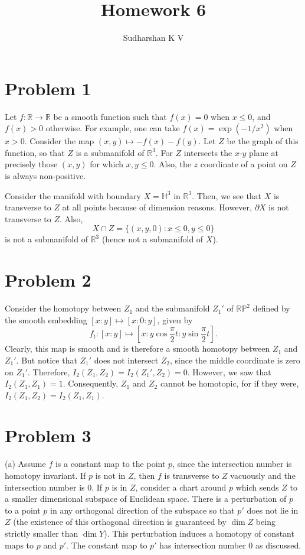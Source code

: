 \documentclass{amsart}
\title{Homework 6}
\author{Sudharshan K V}
\numberwithin{equation}{section}
\theoremstyle{plain}
\theoremstyle{definition}
\theoremstyle{remark}
\renewcommand{\_}[2]{\underbrace{#1}_{#2}}
\renewcommand{\^}[2]{\overbrace{#1}_{#2}}
\newcommand{\R}{\mathbb{R}}
\renewcommand{\P}{\mathbb{P}}
\renewcommand{\H}{\mathbb{H}}
\begin{document}
\maketitle

\section*{Problem 1}
Let $f: \R \to \R$ be a smooth function such that $f(x) = 0$ when $x \leq 0$, and $f(x) > 0$ otherwise. For example, one can take $f(x) =  \exp (-1/x^2)$ when $x> 0$. Consider the map $(x,y)\mapsto -f(x)-f(y)$. Let $Z$ be the graph of this function, so that $Z$ is a submanifold of $\R^3$. For $Z$ intersects the $x$-$y$ plane at precisely those $(x,y)$ for which $x,y\leq 0$. Also, the $z$ coordinate of a point on $Z$ is always non-positive.

Consider the manifold with boundary $X = \H^3$ in $\R^3$. Then, we see that $X$ is transverse to $Z$ at all points because of dimension reasons. However, $\partial X$ is not transverse to $Z$. Also, \[X \cap Z = \{(x,y,0) : x\leq 0, y\leq 0\}\] is not a submanifold of $\R^3$ (hence not a submanifold of $X$). 
\section*{Problem 2}
Consider the homotopy between $Z_1$ and the submanifold $Z_1'$ of $\R\P^2$ defined by the smooth embedding $[x:y]\mapsto [x:0:y]$, given by \[f_t: [x:y] \mapsto [x:y\cos \frac\pi 2 t: y\sin \frac \pi 2 t].\] Clearly, this map is smooth and is therefore a smooth homotopy between $Z_1$ and $Z_1'$. But notice that $Z_1'$ does not intersect $Z_2$, since the middle coordinate is zero on $Z_1'$. Therefore, $I_2(Z_1, Z_2) = I_2(Z_1', Z_2) = 0$. However, we saw that $I_2(Z_1, Z_1) = 1$. Consequently, $Z_1$ and $Z_2$ cannot be homotopic, for if they were, $I_2(Z_1, Z_2) = I_2(Z_1, Z_1)$.

\section*{Problem 3}
(a) Assume $f$ is a constant map to the point $p$, since the intersection number is homotopy invariant. If $p$ is not in $Z$, then $f$ is transverse to $Z$ vacuously and the intersection number is $0$. If $p$ is in $Z$, consider a chart around $p$ which sends $Z$ to a smaller dimensional subspace of Euclidean space. There is a perturbation of $p$ to a point $p$ in any orthogonal direction of the subspace so that $p'$ does not lie in $Z$ (the existence of this orthogonal direction is guaranteed by $\dim Z$ being strictly smaller than $\dim Y$). This perturbation induces a homotopy of constant maps to $p$ and $p'$. The constant map to $p'$ has intersection number $0$ as discussed. \\
\end{document}
